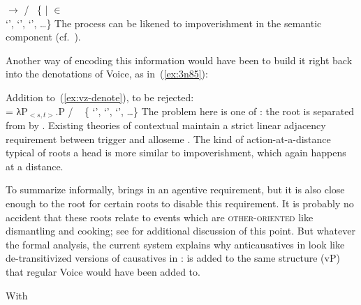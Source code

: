 \begin{exe}
\begin{xlist}
\begin{xlist}
\begin{exe}
\begin{xlist}
\begin{xlist}
\begin{exe}
\begin{xlist}
\begin{xlist}
\begin{exe}
\begin{exe}
\begin{xlist}
\begin{exe}
\begin{exe}
\begin{xlist}
\begin{exe}
\begin{exe}
\begin{exe}
\begin{exe}
\begin{exe}
\begin{xlist}
\begin{exe}
\begin{xlist}
\begin{exe}
\begin{exe}
\begin{xlist}
\begin{exe}
\begin{xlist}
\begin{exe}
\begin{xlist}
\begin{exe}
\begin{exe}
\begin{exe}
\begin{xlist}
\begin{exe}
\begin{exe}
\begin{exe}
\begin{xlist}
\begin{exe}
\begin{xlist}
\begin{exe}
\begin{xlist}
\begin{exe}
\begin{xlist}
\begin{exe}
\begin{exe}
\begin{exe}
\begin{exe}
\begin{xlist}
\begin{exe}
\begin{xlist}
\begin{exe}
\begin{xlist}
\begin{exe}
\begin{xlist}
\begin{exe}
\begin{xlist}
\begin{exe}
\begin{xlist}
\begin{exe}
\begin{exe}
\begin{exe}
\begin{exe}
\begin{xlist}
\begin{exe}
\begin{xlist}
\begin{exe}
\begin{xlist}
\begin{exe}
\begin{exe}
\begin{xlist}
\begin{exe}
\begin{xlist}
\begin{exe}
\begin{exe}
\begin{exe}
\begin{exe}
\begin{xlist}
\begin{xlist}
\begin{exe}
\begin{xlist}
\begin{exe}
\begin{exe}
\begin{exe}
\begin{xlist}
\begin{exe}
\begin{exe}
\begin{xlist}
\begin{exe}
\begin{exe}
\begin{exe}
\begin{xlist}
\begin{xlist}
\begin{exe}
\begin{xlist}
\begin{exe}
\begin{exe}
\begin{exe}
\begin{exe}
\begin{xlist}
\begin{exe}
\begin{xlist}
\begin{exe}
\begin{xlist}
\begin{exe}
\begin{xlist}
\begin{exe}
\label{ex:vz:thit-impov}\denote{\va~\!} $\rightarrow$ {\zero} / {\vz} \trace~\{ |  
  $\in$ 
 \\ \phantom{a} \hfill 
	 `',  `',  `', \dots\}
 \z 
The process can be likened to impoverishment \citep{bonet91,noyer98} in the semantic component (cf.~\citealt{nevins15roots}).

Another way of encoding this information would have been to build it right back into the denotations of Voice, as in~(\ref{ex:3n85}):
 \begin{exe}
\ex  \label{ex:3n85}Addition to~(\ref{ex:vz-denote}), to be rejected: \\
	\denote{\vz} = λP$_{<s,t>}$.P / \trace~{\va} \{ `',  `',  `', \dots\}
 \z 
The problem here is one of : the root is separated from {\vz} by {\va}. Existing theories of contextual  maintain a strict linear adjacency requirement between trigger and alloseme \citep{marantz13,kastner16phd}. The kind of action-at-a-distance typical of roots  a head is more similar to impoverishment, which again happens at a distance.

To summarize informally, {\va} brings in an agentive requirement, but it is also close enough to the root for certain roots to disable this requirement. It is probably no accident that these roots relate to events which are \textsc{other-oriented} like dismantling and cooking; see \cite{kastner17gjgl} for additional discussion of this point. But whatever the formal analysis, the current system explains why anticausatives in {\thit} look like de-transitivized versions of causatives in {\tpie}: {\vz} is added to the same structure (vP) that regular Voice would have been added to.

With 
\end{exe}
\end{exe}
\end{xlist}
\end{exe}
\end{xlist}
\end{exe}
\end{xlist}
\end{exe}
\end{xlist}
\end{exe}
\end{exe}
\end{exe}
\end{exe}
\end{xlist}
\end{exe}
\end{xlist}
\end{xlist}
\end{exe}
\end{exe}
\end{exe}
\end{xlist}
\end{exe}
\end{exe}
\end{xlist}
\end{exe}
\end{exe}
\end{exe}
\end{xlist}
\end{exe}
\end{xlist}
\end{xlist}
\end{exe}
\end{exe}
\end{exe}
\end{exe}
\end{xlist}
\end{exe}
\end{xlist}
\end{exe}
\end{exe}
\end{xlist}
\end{exe}
\end{xlist}
\end{exe}
\end{xlist}
\end{exe}
\end{exe}
\end{exe}
\end{exe}
\end{xlist}
\end{exe}
\end{xlist}
\end{exe}
\end{xlist}
\end{exe}
\end{xlist}
\end{exe}
\end{xlist}
\end{exe}
\end{xlist}
\end{exe}
\end{exe}
\end{exe}
\end{exe}
\end{xlist}
\end{exe}
\end{xlist}
\end{exe}
\end{xlist}
\end{exe}
\end{xlist}
\end{exe}
\end{exe}
\end{exe}
\end{xlist}
\end{exe}
\end{exe}
\end{exe}
\end{xlist}
\end{exe}
\end{xlist}
\end{exe}
\end{xlist}
\end{exe}
\end{exe}
\end{xlist}
\end{exe}
\end{xlist}
\end{exe}
\end{exe}
\end{exe}
\end{exe}
\end{exe}
\end{xlist}
\end{exe}
\end{exe}
\end{xlist}
\end{exe}
\end{exe}
\end{xlist}
\end{xlist}
\end{exe}
\end{xlist}
\end{xlist}
\end{exe}
\end{xlist}
\end{xlist}
\end{exe}
